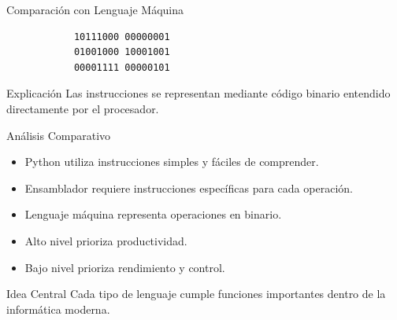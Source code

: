 \documentclass[10pt, aspectratio=169]{beamer}
\begin{document}
	\begin{frame}[fragile]{Comparación con Lenguaje Máquina}
		
		\begin{lstlisting}
			10111000 00000001
			01001000 10001001
			00001111 00000101
		\end{lstlisting}
		
		\vspace{0.5cm}
		
		\begin{block}{Explicación}
			Las instrucciones se representan mediante código binario entendido directamente por el procesador.
		\end{block}
		
	\end{frame}
	
	\begin{frame}{Análisis Comparativo}
		
		\begin{itemize}
			\item Python utiliza instrucciones simples y fáciles de comprender.
			\item Ensamblador requiere instrucciones específicas para cada operación.
			\item Lenguaje máquina representa operaciones en binario.
			\item Alto nivel prioriza productividad.
			\item Bajo nivel prioriza rendimiento y control.
		\end{itemize}
		
		\vspace{0.5cm}
		
		\begin{block}{Idea Central}
			Cada tipo de lenguaje cumple funciones importantes dentro de la informática moderna.
		\end{block}
		
	\end{frame}
	
\end{document}
